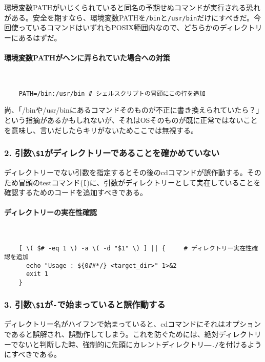 環境変数PATHがいじくられていると同名の予期せぬコマンドが実行される恐れがある。安全を期すなら、環境変数PATHを\verb|/bin|と\verb|/usr/bin|だけにすべきだ。今回使っているコマンドはいずれもPOSIX範囲内なので、どちらかのディレクトリーにあるはずだ。

\paragraph{環境変数PATHがヘンに弄られていた場合への対策} 　\\
\begin{frameboxit}{160.0mm}
\begin{verbatim}
	PATH=/bin:/usr/bin # シェルスクリプトの冒頭にこの行を追加
\end{verbatim}
\end{frameboxit}

尚、「/binや/usr/binにあるコマンドそのものが不正に書き換えられていたら？」という指摘があるかもしれないが、それはOSそのものが既に正常ではないことを意味し、言いだしたらキリがないためここでは無視する。

\subsubsection*{2. 引数\verb|\$1|がディレクトリーであることを確かめていない}

ディレクトリーでない引数を指定するとその後のcdコマンドが誤作動する。そのため冒頭のtestコマンド(\verb|[|)に、引数がディレクトリーとして実在していることを確認するためのコードを追加すべきである。

\paragraph{ディレクトリーの実在性確認} 　\\
\begin{frameboxit}{160.0mm}
\begin{verbatim}
	[ \( $# -eq 1 \) -a \( -d "$1" \) ] || {     # ディレクトリー実在性確認を追加
	  echo "Usage : ${0##*/} <target_dir>" 1>&2
	  exit 1
	}
\end{verbatim}
\end{frameboxit}

\subsubsection*{3. 引数\verb|\$1|が\verb|-|で始まっていると誤作動する}

ディレクトリー名がハイフンで始まっていると、cdコマンドにそれはオプションであると誤解され、誤動作してしまう。これを防ぐためには、絶対ディレクトリーでないと判断した時、強制的に先頭にカレントディレクトリ―\verb|./|を付けるようにすべきである。

